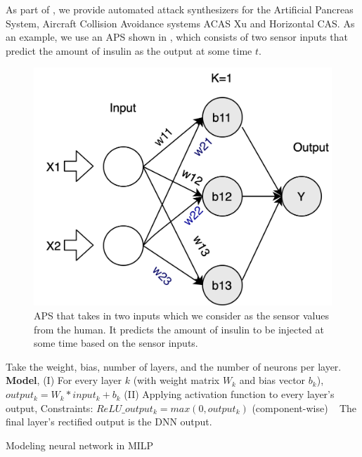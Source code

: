 As part of \tool, we provide automated attack synthesizers for the Artificial Pancreas System, Aircraft Collision Avoidance systems ACAS Xu and Horizontal CAS. 
As an example, we use an \ac{APS} shown in \label{fig:toyaps}, which consists of two sensor inputs that predict the amount of insulin as the output at some time $t$. 
\begin{figure}
	\centering
	\includegraphics[width=0.7\linewidth]{Images/ToyAPS}
	\caption[APS]{APS that takes in two inputs which we consider as the sensor values from the human. It predicts the amount of insulin to be injected at some time based on the sensor inputs.}
	\label{fig:toyaps}
\end{figure}


\begin{algorithm}
	Take the weight, bias, number of layers, and the number of neurons per layer. \\
	
	\textbf{Model}, \linebreak
	(I) For every layer $k$ (with weight matrix $W_k$ and bias vector $b_k$), $output_k = W_k * input_k + b_k$
	\linebreak
	(II) Applying activation function to every layer's output,
	\linebreak
	Constraints: $ReLU\_output_k = max(0, output_k)$ (component-wise) \
	\linebreak
	The final layer's rectified output is the DNN output.
	
	\caption{Modeling neural network in MILP}
	\label{algo:b}
\end{algorithm}


